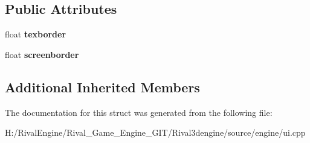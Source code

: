 \subsection*{Public Attributes}
\begin{DoxyCompactItemize}
\item 
\mbox{\label{struct_u_i_1_1_bordered_image_a82119c3e47440b8df03bd85933767dcf}} 
float {\bfseries texborder}
\item 
\mbox{\label{struct_u_i_1_1_bordered_image_aa0da7ec74ecffa449c8b6e1628b759eb}} 
float {\bfseries screenborder}
\end{DoxyCompactItemize}
\subsection*{Additional Inherited Members}


The documentation for this struct was generated from the following file\+:\begin{DoxyCompactItemize}
\item 
H\+:/\+Rival\+Engine/\+Rival\+\_\+\+Game\+\_\+\+Engine\+\_\+\+G\+I\+T/\+Rival3dengine/source/engine/ui.\+cpp\end{DoxyCompactItemize}
